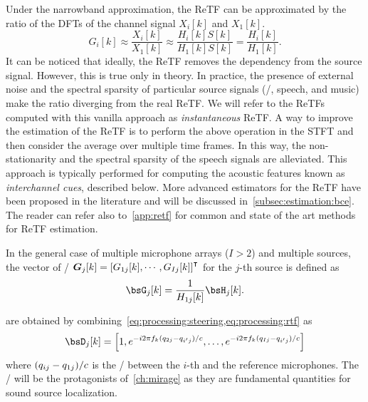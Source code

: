 \mynewline
Under the narrowband approximation, the \ac{ReTF} can be approximated by the ratio of the \acp{DFT} of the channel signal $X_i[k]$ and $X_1[k]$.
\begin{equation}\label{eq:processing:inst_retf}
    G_i[k] \approx \frac{X_i[k]}{X_1[k]} \approx \frac{H_i[k]S[k]}{H_1[k]S[k]} = \frac{H_i[k]}{H_1[k]}
    .
\end{equation}
It can be noticed that ideally, the \ac{ReTF} removes the dependency from the source signal.
However, this is true only in theory.
In practice, the presence of external noise and the spectral sparsity of particular source signals (\eg/, speech, and music) make the ratio diverging from the real \ac{ReTF}.
We will refer to the \acp{ReTF} computed with this vanilla approach as \textit{instantaneous} \ac{ReTF}.
A way to improve the estimation of the \ac{ReTF} is to perform the above operation in the \ac{STFT} and then consider the average over multiple time frames.
In this way, the non-stationarity and the spectral sparsity of the speech signals are alleviated.
This approach is typically performed for computing the acoustic features known as \textit{interchannel cues}, described below.
More advanced estimators for the \ac{ReTF} have been proposed in the literature and will be discussed in~\cref{subsec:estimation:bce}.
The reader can refer also to~\cref{app:retf} for common and state of the art methods for \ac{ReTF} estimation.


\mynewline
In the general case of multiple microphone arrays ($I>2$) and multiple sources, the vector of \ReTFs/
$\boldsymbol{G}_j[k] = \ktranspose{\klist{{G}_ {1j}[k], \cdots, {G}_{Ij}[k]}}$
for the $j$-th source is defined as
\begin{equation}
    {\bsG}_j[k] = \frac{1}{{H}_{1j}[k]} {\bsH}_j[k]
    .
\end{equation}

 are obtained by combining~\cref{eq:processing:steering,eq:processing:rtf} as
\begin{equation}\label{eq:processing:relativesteering}
    {\bsD}_{j}[k] = \klist{
                         1,
                         \cste^{-\csti 2 \pi f_k (\distMicSrc_{2j}-\distMicSrc_{i'j}) / \speedOfSound},
                         \ldots,
                         \cste^{-\csti 2 \pi f_k (\distMicSrc_{Ij}-\distMicSrc_{i'j}) / \speedOfSound}
                    }
\end{equation}
where $(q_{ij}-q_{1j}) / c$ is the \TDOA/ between the $i$-th and the reference microphones.
The \TDOAs/ will be the protagonists of~\cref{ch:mirage} as they are fundamental quantities for sound source localization.

